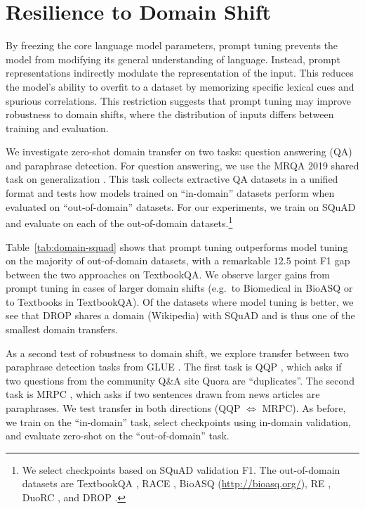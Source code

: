 \section{Resilience to Domain Shift}
\label{sec:shift}

By freezing the core language model parameters, prompt tuning prevents the model from modifying its general understanding of language. Instead, prompt representations indirectly modulate the representation of the input. This reduces the model's ability to overfit to a dataset by memorizing specific lexical cues and spurious correlations. This restriction suggests that prompt tuning may improve robustness to domain shifts, where the distribution of inputs differs between training and evaluation.

We investigate zero-shot domain transfer on two tasks: question answering (QA) and paraphrase detection. For question answering, we use the MRQA 2019 shared task on generalization \cite{fisch2019mrqa}. This task collects extractive QA datasets in a unified format and tests how models trained on ``in-domain'' datasets perform when evaluated on ``out-of-domain'' datasets. For our experiments, we train on SQuAD \cite{rajpurkar-etal-2016-squad} and evaluate on each of the out-of-domain datasets.\footnote{We select checkpoints based on SQuAD validation F1. The out-of-domain datasets are TextbookQA \cite{8100054}, RACE \cite{lai-etal-2017-race}, BioASQ (\url{http://bioasq.org/}), RE \cite{levy-etal-2017-zero}, DuoRC \cite{saha-etal-2018-duorc}, and DROP \cite{dua-etal-2019-drop}.}

Table~\ref{tab:domain-squad} shows that prompt tuning outperforms model tuning on the majority of out-of-domain datasets, with a remarkable $12.5$ point F1 gap between the two approaches on TextbookQA. We observe larger gains from prompt tuning in cases of larger domain shifts (e.g.~to Biomedical in BioASQ or to Textbooks in TextbookQA). Of the datasets where model tuning is better, we see that DROP shares a domain (Wikipedia) with SQuAD and is thus one of the smallest domain transfers.

As a second test of robustness to domain shift, we explore transfer between two paraphrase detection tasks from GLUE \cite{wang2019glue}. The first task is QQP \cite{WinNT}, which asks if two questions from the community Q\&A site Quora are ``duplicates''. The second task is MRPC \cite{dolan2005automatically}, which asks if two sentences drawn from news articles are paraphrases. We test transfer in both directions (QQP $\Leftrightarrow$ MRPC). As before, we train on the ``in-domain'' task, select checkpoints using in-domain validation, and evaluate zero-shot on the ``out-of-domain'' task.

